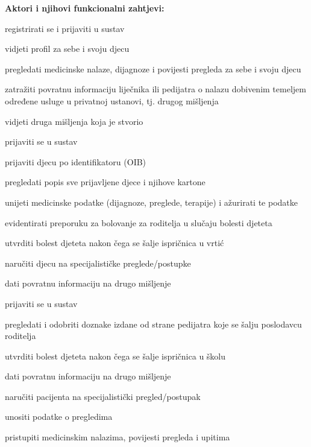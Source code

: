			\noindent \textbf{Aktori i njihovi funkcionalni zahtjevi:}
			\begin{packed_enum}
				\item  {}
				\begin{packed_enum}
					\item registrirati se i prijaviti u sustav
                    \item vidjeti profil za sebe i svoju djecu
					\item pregledati medicinske nalaze, dijagnoze i povijesti pregleda za sebe i svoju djecu
                    \item zatražiti povratnu informaciju liječnika ili pedijatra o nalazu dobivenim temeljem određene usluge u privatnoj ustanovi, tj. drugog mišljenja
                    \item vidjeti druga mišljenja koja je stvorio
				\end{packed_enum}
			
				\item  {}
				\begin{packed_enum}
					\item prijaviti se u sustav
                    \item prijaviti djecu po identifikatoru (OIB)
                    \item pregledati popis sve prijavljene djece i njihove kartone
					\item unijeti medicinske podatke (dijagnoze, preglede, terapije) i ažurirati te podatke
                    \item evidentirati preporuku za bolovanje za roditelja u slučaju bolesti djeteta
                    \item utvrditi bolest djeteta nakon čega se šalje ispričnica u vrtić
                    \item naručiti djecu na specijalističke preglede/postupke
                    \item dati povratnu informaciju na drugo mišljenje
				\end{packed_enum}

                \item  {}
				\begin{packed_enum}
					\item prijaviti se u sustav
                    \item pregledati i odobriti doznake izdane od strane pedijatra koje se šalju poslodavcu roditelja
                    \item utvrditi bolest djeteta nakon čega se šalje ispričnica u školu
                    \item dati povratnu informaciju na drugo mišljenje
                    \item naručiti pacijenta na specijalistički pregled/postupak
                    \item unositi podatke o pregledima
                    \item pristupiti medicinskim nalazima, povijesti pregleda i upitima 
				\end{packed_enum}
    

\end{packed_enum}

